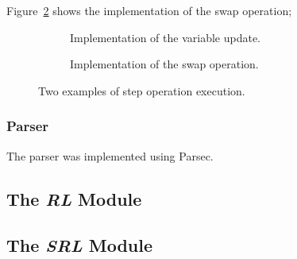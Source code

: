 Figure~\ref{fig:exswap} shows the implementation of the swap operation;




\begin{figure}

  \begin{subfigure}{\textwidth}
    
    \caption{Implementation of the variable update.}\label{fig:exupdate}
  \end{subfigure}

  \begin{subfigure}{\textwidth}
    
    \caption{Implementation of the swap operation.}\label{fig:exswap}
  \end{subfigure}

  \caption{Two examples of step operation execution.}\label{fig:examples}

\end{figure}

\subsubsection{Parser}
The parser was implemented using Parsec.


\subsection{The \textit{RL} Module}



\subsection{The \textit{SRL} Module}
